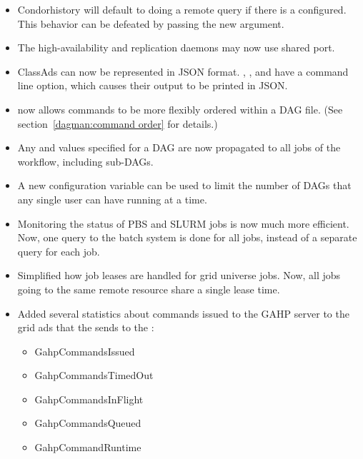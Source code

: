 \begin{itemize}
\item Condor{history} will default to doing a remote query if there is a  configured. This behavior
can be defeated by passing the new  argument.

\item The high-availability and replication daemons may now use shared port.

\item ClassAds can now be represented in JSON format.
, , and  have a 
command line option, which causes their output to be printed in JSON.

\item {} now allows commands to be more flexibly ordered
within a DAG file.  (See section~\ref{dagman:command order} for details.)

\item Any  and
 values specified for a
DAG are now propagated to all jobs of the workflow, including sub-DAGs.

\item A new configuration variable 
can be used to limit the number of DAGs that any single user can have running at
a time.

\item Monitoring the status of PBS and SLURM jobs is now much more efficient.
Now, one query to the batch system is done for all jobs, instead of a
separate query for each job.

\item Simplified how job leases are handled for grid universe jobs.
Now, all jobs going to the same remote resource share a single lease
time.

\item Added several statistics about commands issued to the GAHP server
to the grid ads that the  sends to the :
  \begin{itemize}
  \item GahpCommandsIssued
  \item GahpCommandsTimedOut
  \item GahpCommandsInFlight
  \item GahpCommandsQueued
  \item GahpCommandRuntime
  \end{itemize}


\end{itemize}

